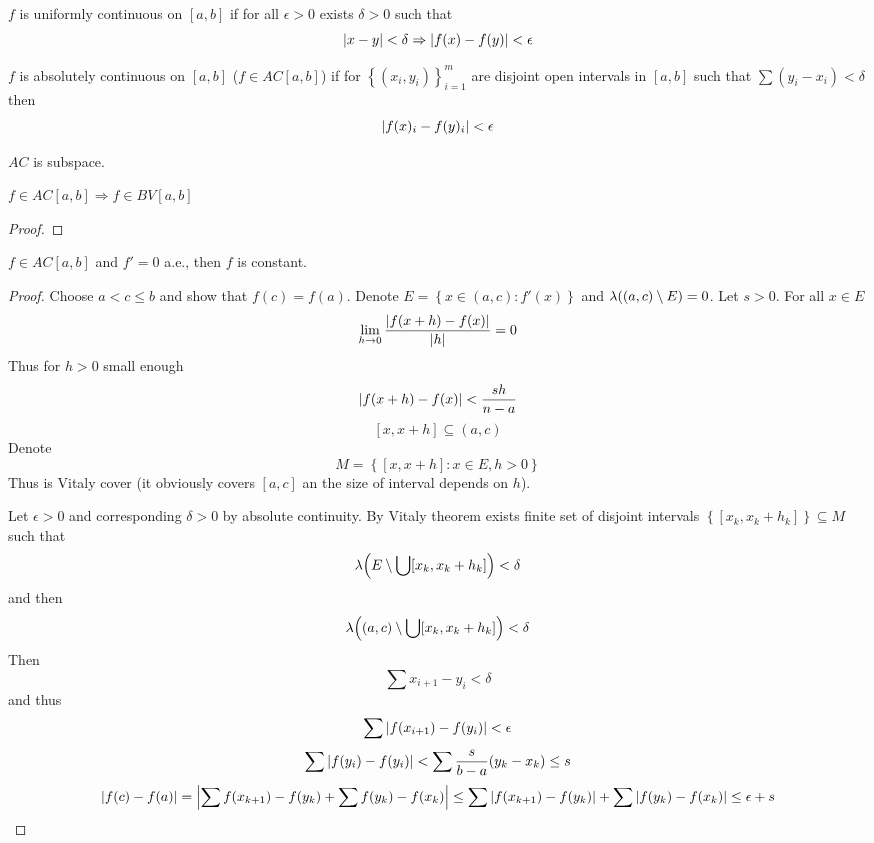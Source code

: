 \begin{definition}
	$f$ is uniformly continuous on $[a,b]$ if for all $\epsilon>0$ exists $\delta>0$ such that 
	$$\abs{x-y}<\delta \Rightarrow \abs{f(x)-f(y)} <\epsilon$$
\end{definition}
\begin{definition}
	$f$ is absolutely continuous on $[a,b]$ ($f\in AC[a,b]$) if for $\left\{ (x_i,y_i) \right\}_{i=1}^m$ are disjoint open intervals in $[a,b]$ such that $\sum (y_i-x_i) <\delta$ then
	$$\abs{f(x)_i-f(y)_i} <\epsilon$$

\end{definition}
\begin{prop}
	$AC$ is subspace.
\end{prop}
\begin{prop}
$f\in AC[a,b] \Rightarrow f \in BV[a,b]$
\begin{proof}
	
\end{proof}
\end{prop}
\begin{prop}
$f\in AC[a,b]$ and $f'=0$ a.e., then $f$ is constant.
\begin{proof}
	Choose $a<c\leq b$ and show that $f(c)=f(a)$. Denote $E = \left\{ x \in (a,c) : f'(x) \right\}$ and $\lambda\qty((a,c) \setminus E) = 0$. Let $s>0$. For all $x\in E$
	$$\lim_{h\to 0} \frac{\abs{f(x+h)-f(x)}}{\abs{h}} = 0$$
	Thus for $h>0$ small enough
	$$\abs{f(x+h)-f(x)} < \frac{sh}{n-a}$$
	$$[x,x+h] \subseteq (a,c)$$
	Denote
	$$M = \left\{ [x,x+h]: x\in E, h>0 \right\}$$
	Thus is Vitaly cover (it obviously covers $[a,c]$ an the size of interval depends on $h$). 
	
	Let $\epsilon>0$ and corresponding $\delta>0$ by absolute continuity. By Vitaly theorem exists finite set of disjoint intervals $\left\{  [x_k,x_k+h_k]\right\}\subseteq M$ such that
	$$\lambda\qty(E\setminus \bigcup  [x_k,x_k+h_k]) <\delta$$
	and then
	$$\lambda\qty((a,c)\setminus \bigcup  [x_k,x_k+h_k]) <\delta$$
	Then 
	$$\sum x_{i+1} - y_i <\delta$$
	and thus
	$$\sum \abs{f(x_{i+1})-f(y_i)} <\epsilon$$
	$$\sum \abs{f(y_{i})-f(y_i)} <\sum \frac{s}{b-a} (y_k-x_k) \leq s$$
	$$\abs{f(c) - f(a) } = \abs{\sum f(x_{k+1}) - f(y_k) + \sum f(y_k) -f(x_k)} \leq \sum \abs{f(x_{k+1}) - f(y_k)} + \sum \abs{f(y_k) -f(x_k)} \leq \epsilon+s  $$
\end{proof}
\end{prop}

